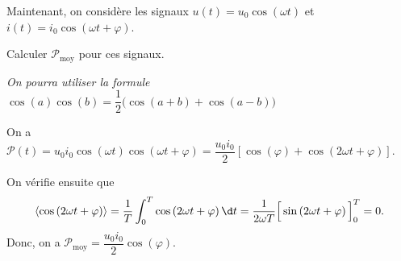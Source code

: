 


\pauseEntrainement

\bigskip\smallskip

Maintenant, on considère les signaux
$u(t)=u_{0}\cos\left(\omega t\right)$
et
$i(t)=i_{0}\cos\left(\omega t+\varphi\right)$.

\repriseEntrainement




\begin{enonce}
Calculer $\mathcal{P}_{\text{moy}}$ pour ces signaux. \minusBigskip

{\itshape On pourra utiliser la formule $\cos (a)\cos (b)=\dfrac{1}{2}\big( \cos (a+b) + \cos (a-b) \big)$}
\end{enonce}


\begin{corrige}
On a $\mathcal{P}(t)=u_{0}i_{0}\cos\left(\omega t\right)\cos\left(\omega t+\varphi\right)=\dfrac{u_{0}i_{0}}{2}\left[\cos(\varphi)+\cos\left(2\omega t+\varphi\right)\right]$.

On vérifie ensuite que
\[
\left\langle \cos\left(2\omega t+\varphi\right)\right\rangle 
= \frac{1}{T}\int_0^T \cos\left(2\omega t+\varphi\right) \d t 
= \frac{1}{2\omega T} \Big [ \sin \left(2\omega t+\varphi\right)\Big ]_0^T = 0.
\]
Donc, on a  $\mathcal{P}_{\text{moy}} =\dfrac{u_{0}i_{0}}{2}\cos(\varphi)$.
\end{corrige}





\pauseEntrainement

\bigskip\smallskip

